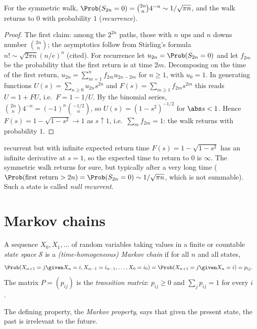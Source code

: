 \begin{theorem}\label{thm:returns}
For the symmetric walk, $\Prob(S_{2n}=0)=\binom{2n}n4^{-n}\sim1/\sqrt{\pi n}$, and the walk
returns to $0$ with probability $1$ (\emph{recurrence}).
\end{theorem}
\begin{proof}
The first claim: among the $2^{2n}$ paths, those with $n$ ups and $n$ downs number
$\binom{2n}n$; the asymptotics follow from Stirling's formula
$n!\sim\sqrt{2\pi n}(n/e)^n$ (cited). For recurrence let $u_{2n}=\Prob(S_{2n}=0)$ and
let $f_{2m}$ be the probability that the first return is at time $2m$. Decomposing on the
time of the first return, $u_{2n}=\sum_{m=1}^nf_{2m}u_{2n-2m}$ for $n\ge1$, with
$u_0=1$. In generating functions $U(s)=\sum_{n\ge0}u_{2n}s^{2n}$ and
$F(s)=\sum_{m\ge1}f_{2m}s^{2m}$ this reads $U=1+FU$, i.e.\ $F=1-1/U$. By the binomial
series, $\binom{2n}n4^{-n}=(-1)^n\binom{-1/2}n$, so $U(s)=(1-s^2)^{-1/2}$ for $\abs s<1$.
Hence $F(s)=1-\sqrt{1-s^2}\to1$ as $s\uparrow1$, i.e.\ $\sum_mf_{2m}=1$: the walk
returns with probability $1$.
\end{proof}

\begin{nuance}{recurrent but with infinite expected return time}
$F(s)=1-\sqrt{1-s^2}$ has an infinite derivative at $s=1$, so the expected time to
return to $0$ is $\infty$. The symmetric walk returns for sure, but typically after a
very long time ($\Prob(\text{first return}>2n)=\Prob(S_{2n}=0)\sim1/\sqrt{\pi n}$,
which is not summable). Such a state is called \emph{null recurrent}.
\end{nuance}

\section{Markov chains}

\begin{definition}
A sequence $X_0,X_1,\dots$ of random variables taking values in a finite or countable
\emph{state space} $\mathcal S$ is a \emph{(time-homogeneous) Markov chain} if for all
$n$ and all states,
\[
\Prob(X_{n+1}=j\given X_n=i,X_{n-1}=i_{n-1},\dots,X_0=i_0)=\Prob(X_{n+1}=j\given X_n=i)=p_{ij}.
\]
The matrix $P=(p_{ij})$ is the \emph{transition matrix}: $p_{ij}\ge0$ and
$\sum_jp_{ij}=1$ for every $i$.
\end{definition}

The defining property, the \emph{Markov property}, says that given the present state,
the past is irrelevant to the future.

